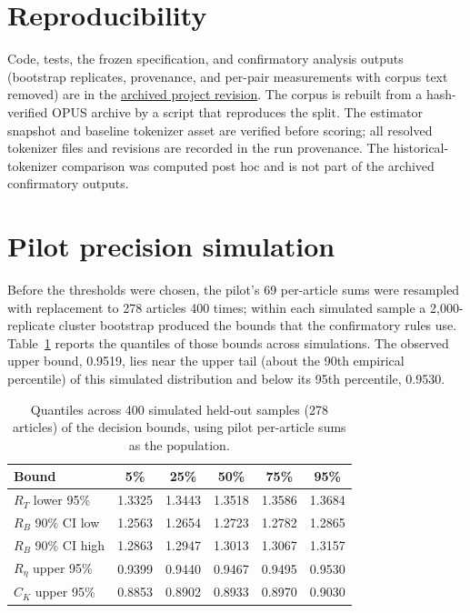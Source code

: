 \documentclass[11pt,a4paper]{article}
\newcommand{\RT}{R_{T}}
\newcommand{\RB}{R_{B}}
\newcommand{\Reta}{R_{\eta}}
\newcommand{\CK}{C_{K}}
\begin{document}
\section*{Reproducibility}

Code, tests, the frozen specification, and confirmatory analysis outputs
(bootstrap replicates, provenance, and per-pair measurements with corpus text
removed) are in the
\href{https://github.com/damifiance/korean-token-tax/tree/2ebe80ea7dae8722d69cb918d3bbbacbde47e317}{archived
project revision}. The corpus is rebuilt from a hash-verified OPUS archive by
a script that reproduces the split. The estimator snapshot and baseline
tokenizer asset are verified before scoring; all resolved tokenizer files and
revisions are recorded in the run provenance. The historical-tokenizer
comparison was computed post hoc and is not part of the archived
confirmatory outputs.




\appendix

\section{Pilot precision simulation}

Before the thresholds were chosen, the pilot's 69 per-article sums were
resampled with replacement to 278 articles 400 times; within each simulated
sample a 2{,}000-replicate cluster bootstrap produced the bounds that the
confirmatory rules use. Table~\ref{tab:precision} reports the quantiles of
those bounds across simulations. The observed upper bound, 0.9519, lies near
the upper tail (about the 90th empirical percentile) of this simulated
distribution and below its 95th percentile, 0.9530.

\begin{table}[H]
\centering\small
\caption{Quantiles across 400 simulated held-out samples (278 articles) of
the decision bounds, using pilot per-article sums as the population.}
\label{tab:precision}
\begin{tabular}{@{}lccccc@{}}
\toprule
Bound & 5\% & 25\% & 50\% & 75\% & 95\% \\
\midrule
$\RT$ lower 95\%    & 1.3325 & 1.3443 & 1.3518 & 1.3586 & 1.3684 \\
$\RB$ 90\% CI low   & 1.2563 & 1.2654 & 1.2723 & 1.2782 & 1.2865 \\
$\RB$ 90\% CI high  & 1.2863 & 1.2947 & 1.3013 & 1.3067 & 1.3157 \\
$\Reta$ upper 95\%  & 0.9399 & 0.9440 & 0.9467 & 0.9495 & 0.9530 \\
$\CK$ upper 95\%    & 0.8853 & 0.8902 & 0.8933 & 0.8970 & 0.9030 \\
\bottomrule
\end{tabular}
\end{table}
\end{document}
